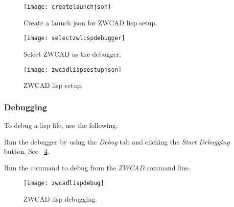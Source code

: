\begin{figure}
	\centering
	\texttt{[image: createlaunchjson]}
	\caption{Create a launch json for ZWCAD lisp setup.}
	\label{fig:createlaunchjson}
\end{figure}

\begin{figure}
	\centering
	\texttt{[image: selectzwlispdebugger]}
	\caption{Select ZWCAD as the debugger.}
	\label{fig:selectzwlispdebugger}
\end{figure}

\begin{figure}
	\centering
	\texttt{[image: zwcadlispsestupjson]}
	\caption{ZWCAD lisp setup.}
	\label{fig:zwcadlispsestupjson}
\end{figure}

\subsubsection{Debugging}
To debug a lisp file, use the following.
\begin{numberedlist}
	\item Run the debugger by using the \textit{Debug} tab and clicking the \textit{Start Debugging} button.  See \figurename~\ref{fig:zwcadlispdebug}.
	\item Run the command to debug from the \emph{ZWCAD} command line.
\end{numberedlist}

\begin{figure}
	\centering
	\texttt{[image: zwcadlispdebug]}
	\caption{ZWCAD lisp debugging.}
	\label{fig:zwcadlispdebug}
\end{figure} 